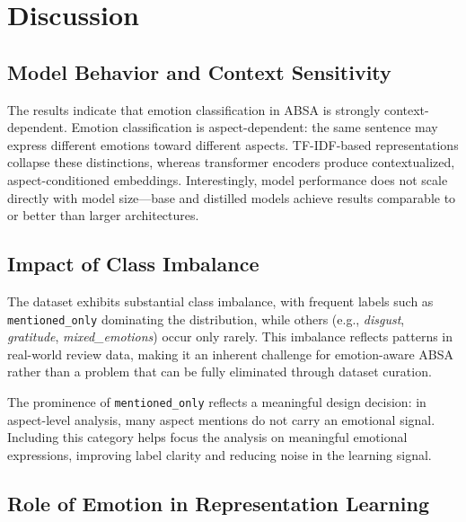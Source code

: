 \documentclass[10pt]{article}
\begin{document}
\section{Discussion}

\subsection{Model Behavior and Context Sensitivity}

The results indicate that emotion classification in ABSA is strongly context-dependent. Emotion classification is aspect-dependent: the same sentence may express different emotions toward different aspects. TF-IDF-based representations collapse these distinctions, whereas transformer encoders produce contextualized, aspect-conditioned embeddings. Interestingly, model performance does not scale directly with model size---base and distilled models achieve results comparable to or better than larger architectures.

\subsection{Impact of Class Imbalance}

The dataset exhibits substantial class imbalance, with frequent labels such as \texttt{mentioned\_only} dominating the distribution, while others (e.g., \emph{disgust}, \emph{gratitude}, \emph{mixed\_emotions}) occur only rarely. This imbalance reflects patterns in real-world review data, making it an inherent challenge for emotion-aware ABSA rather than a problem that can be fully eliminated through dataset curation.

The prominence of \texttt{mentioned\_only} reflects a meaningful design decision: in aspect-level analysis, many aspect mentions do not carry an emotional signal. Including this category helps focus the analysis on meaningful emotional expressions, improving label clarity and reducing noise in the learning signal.

\subsection{Role of Emotion in Representation Learning}
\end{document}
